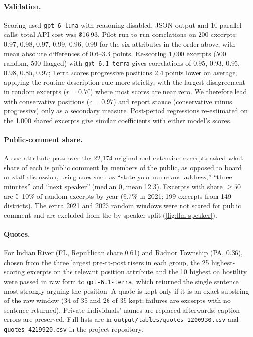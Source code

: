 \paragraph{Validation.}
Scoring used \texttt{gpt-6-luna} with reasoning disabled, JSON output and 10 parallel calls; total API cost was \$16.93. Pilot run-to-run correlations on 200 excerpts: 0.97, 0.98, 0.97, 0.99, 0.96, 0.99 for the six attributes in the order above, with mean absolute differences of 0.6--3.3 points. Re-scoring 1,000 excerpts (500 random, 500 flagged) with \texttt{gpt-6.1-terra} gives correlations of 0.95, 0.93, 0.95, 0.98, 0.85, 0.97; Terra scores progressive positions 2.4 points lower on average, applying the routine-description rule more strictly, with the largest disagreement in random excerpts ($r=0.70$) where most scores are near zero. We therefore lead with conservative positions ($r=0.97$) and report stance (conservative minus progressive) only as a secondary measure. Post-period regressions re-estimated on the 1,000 shared excerpts give similar coefficients with either model's scores.

\paragraph{Public-comment share.}
A one-attribute pass over the 22,174 original and extension excerpts asked what share of each is public comment by members of the public, as opposed to board or staff discussion, using cues such as ``state your name and address,'' ``three minutes'' and ``next speaker'' (median 0, mean 12.3). Excerpts with share $\ge 50$ are 5--10\% of random excerpts by year (9.7\% in 2021; 199 excerpts from 149 districts). The extra 2021 and 2023 random windows were not scored for public comment and are excluded from the by-speaker split (\cref{fig:llm-speaker}).

\paragraph{Quotes.}
For Indian River (FL, Republican share 0.61) and Radnor Township (PA, 0.36), chosen from the three largest pre-to-post risers in each group, the 25 highest-scoring excerpts on the relevant position attribute and the 10 highest on hostility were passed in raw form to \texttt{gpt-6.1-terra}, which returned the single sentence most strongly arguing the position. A quote is kept only if it is an exact substring of the raw window (34 of 35 and 26 of 35 kept; failures are excerpts with no sentence returned). Private individuals' names are replaced afterwards; caption errors are preserved. Full lists are in \texttt{output/tables/quotes\_1200930.csv} and \texttt{quotes\_4219920.csv} in the project repository.


